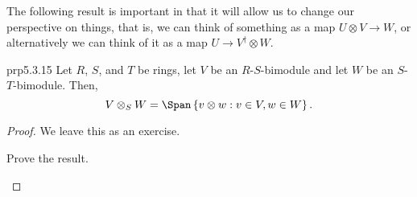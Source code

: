 The following result is important in that it will allow us to change our perspective on things, that is, we can think of something as a map $U\otimes V\rightarrow W$, or alternatively we can think of it as a map $U\rightarrow V^{\dagger}\otimes W$.

\begin{prp}{}{prp5.3.15}
	Let $R$, $S$, and $T$ be rings, let $V$ be an $R$-$S$-bimodule and let $W$ be an $S$-$T$-bimodule.  Then,
	\begin{equation}
	V\otimes _SW=\Span \left\{ v\otimes w:v\in V,w\in W\right\} .
	\end{equation}
	\begin{proof}
		We leave this as an exercise.
		\begin{exr}[breakable=false]{}{}
			Prove the result.
		\end{exr}
	\end{proof}
\end{prp}

